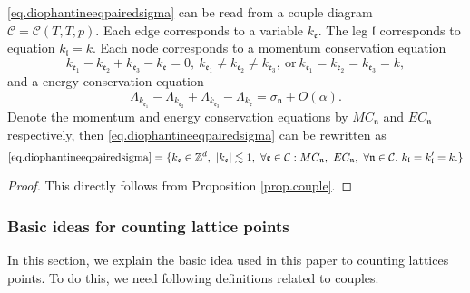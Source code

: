 \begin{prop}\label{prop.couple'}
\eqref{eq.diophantineeqpairedsigma} can be read from a couple diagram $\mathcal{C}=\mathcal{C}(T,T,p)$. Each edge corresponds to a variable $k_{\mathfrak{e}}$. The leg $\mathfrak{l}$ corresponds to equation $k_{\mathfrak{l}}=k$. Each node corresponds to a momentum conservation equation
\begin{equation}\label{eq.momentumconservationunit}
    k_{\mathfrak{e}_1}-k_{\mathfrak{e}_2}+k_{\mathfrak{e}_3}-k_{\mathfrak{e}}=0,\ k_{\mathfrak{e}_1}\ne k_{\mathfrak{e}_2}\ne k_{\mathfrak{e}_3},\ \text{or}\ k_{\mathfrak{e}_1}= k_{\mathfrak{e}_2}= k_{\mathfrak{e}_3}=k,
\end{equation} 
and a energy conservation equation 
\begin{equation}\label{eq.energyconservationunit}
    \Lambda_{k_{\mathfrak{e}_1}}-\Lambda_{k_{\mathfrak{e}_2}}+\Lambda_{k_{\mathfrak{e}_3}}-\Lambda_{k_{\mathfrak{e}}} =\sigma_{\mathfrak{n}}+O(\alpha).
\end{equation}  
Denote the momentum and energy conservation equations by $MC_{\mathfrak{n}}$ and $EC_{\mathfrak{n}}$ respectively, then \eqref{eq.diophantineeqpairedsigma} can be rewritten as 
\begin{equation}\label{eq.diophantineeqpairedsigma'}
    \text{\eqref{eq.diophantineeqpairedsigma}}=\{k_{\mathfrak{e}}\in \mathbb{Z}^d,\ |k_{\mathfrak{e}}| \lesssim 1,\ \forall \mathfrak{e}\in \mathcal{C}:MC_{\mathfrak{n}},\  EC_{\mathfrak{n}},\ \forall \mathfrak{n}\in \mathcal{C}.\ k_{\mathfrak{l}}=k_{\mathfrak{l}}'=k.\}
\end{equation}
\end{prop}
\begin{proof}
This directly follows from Proposition \ref{prop.couple}. 
\end{proof}

\subsubsection{Basic ideas for counting lattice points} In this section, we explain the basic idea used in this paper to counting lattices points. To do this, we need following definitions related to couples.

